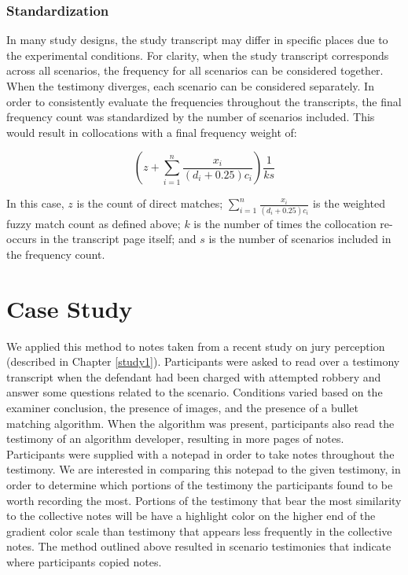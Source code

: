 \documentclass[print]{nuthesis}
\begin{document}
\hypertarget{standardization}{%
\subsubsection{Standardization}\label{standardization}}

In many study designs, the study transcript may differ in specific places due to the experimental conditions.
For clarity, when the study transcript corresponds across all scenarios, the frequency for all scenarios can be considered together.
When the testimony diverges, each scenario can be considered separately.
In order to consistently evaluate the frequencies throughout the transcripts, the final frequency count was standardized by the number of scenarios included.
This would result in collocations with a final frequency weight of:

\[
(z+\sum_{i=1}^n\frac{x_i}{(d_i+0.25)c_i})\frac{1}{ks}
\]

In this case, \(z\) is the count of direct matches; \(\sum_{i=1}^n\frac{x_i}{(d_i+0.25)c_i}\) is the weighted fuzzy match count as defined above; \(k\) is the number of times the collocation re-occurs in the transcript page itself; and \(s\) is the number of scenarios included in the frequency count.

\hypertarget{case-study}{%
\section{Case Study}\label{case-study}}

We applied this method to notes taken from a recent study on jury perception (described in Chapter \ref{study1}).
Participants were asked to read over a testimony transcript when the defendant had been charged with attempted robbery and answer some questions related to the scenario.
Conditions varied based on the examiner conclusion, the presence of images, and the presence of a bullet matching algorithm.
When the algorithm was present, participants also read the testimony of an algorithm developer, resulting in more pages of notes.
Participants were supplied with a notepad in order to take notes throughout the testimony.
We are interested in comparing this notepad to the given testimony, in order to determine which portions of the testimony the participants found to be worth recording the most.
Portions of the testimony that bear the most similarity to the collective notes will be have a highlight color on the higher end of the gradient color scale than testimony that appears less frequently in the collective notes.
The method outlined above resulted in scenario testimonies that indicate where participants copied notes.
\end{document}
